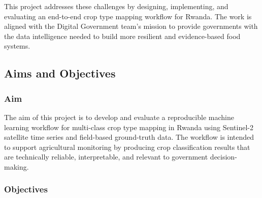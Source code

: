 This project addresses these challenges by designing, implementing, and
evaluating an end-to-end crop type mapping workflow for Rwanda. The work is
aligned with the Digital Government team's mission to provide governments with
the data intelligence needed to build more resilient and evidence-based food
systems.


\subsection{Aims and Objectives}

\label{sec:intro_aims_obj}


\subsubsection*{Aim}

The aim of this project is to develop and evaluate a reproducible machine
learning workflow for multi-class crop type mapping in Rwanda using
Sentinel-2 satellite time series and field-based ground-truth data. The
workflow is intended to support agricultural monitoring by producing crop
classification results that are technically reliable, interpretable, and
relevant to government decision-making.

\subsubsection*{Objectives}

